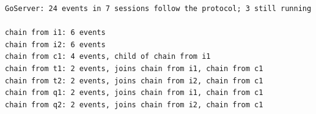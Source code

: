 \begin{lstlisting}[language={},basicstyle=\ttfamily\footnotesize,breaklines=true]
GoServer: 24 events in 7 sessions follow the protocol; 3 still running

chain from i1: 6 events
chain from i2: 6 events
chain from c1: 4 events, child of chain from i1
chain from t1: 2 events, joins chain from i1, chain from c1
chain from t2: 2 events, joins chain from i2, chain from c1
chain from q1: 2 events, joins chain from i1, chain from c1
chain from q2: 2 events, joins chain from i2, chain from c1
\end{lstlisting}
